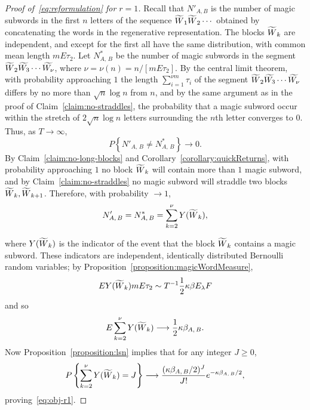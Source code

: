 \documentclass[10pt]{amsart}
\theoremstyle{definition}\newtheorem{defi}[theo]{Definition}\newtheorem{rema}[theo]{Remark}\newtheorem{exam}[theo]{Example}\newtheorem{exem}[theo]{Example}\newtheorem{nota}[theo]{Notation}
\let\oldtilde\tilde
\renewcommand*{\tilde}[1]{\mathchoice{\widetilde{#1}}{\widetilde{#1}}{\oldtilde{#1}}{\oldtilde{#1}}}\let\oldforall\forall
\renewcommand*{\forall}{\mathrel{\oldforall}}
\begin{document}
\begin{proof}[Proof of~\eqref{eq:reformulation} for $r= 1$]
Recall that $N'_{A,B}$ is the number of magic subwords in the first $n$ letters of the sequence $\tilde{W}_{1}\tilde{W}_{2}\dotsb$ obtained by concatenating the words in the regenerative representation. The blocks $\tilde{W}_{k}$ are independent, and except for the first all have the same distribution, with common mean length $mE\tau_{2}$. Let $N^{*}_{A,\,B}$ be the number of magic subwords in the segment $\tilde{W}_{2}\tilde{W_{3}}\dotsb \tilde{W_{\nu}}$, where $\nu =\nu (n)=n/[m E\tau_{2}]$. By the central limit theorem, with probability approaching $1$ the length $\sum_{i=1}^{\nu m}\tau_{i}$ of the segment $\tilde{W}_{2}\tilde{W_{3}}\dotsb \tilde{W_{\nu}}$ differs by no more than $\sqrt{n}\log n$ from $n$, and by the same argument as in the proof of Claim~\ref{claim:no-straddles}, the probability that a magic subword occur within the stretch of $2\sqrt{n}\log n$ letters surrounding the $n$th letter converges to $0$. Thus, as $T \rightarrow\infty$,
\[
P\left\{N'_{A,\,B}\not =N^{*}_{A,\,B} \right\} \longrightarrow 0.
\]
By Claim~\ref{claim:no-long-blocks} and Corollary~\ref{corollary:quickReturns}, with probability approaching $1$ no block $\tilde{W}_{k}$ will contain more than $1$ magic subword, and by Claim~\ref{claim:no-straddles} no magic subword will straddle two blocks $\tilde{W}_{k},\tilde{W}_{k+1}$. Therefore, with probability $\rightarrow 1$,
\[
N'_{A,\,B}=N^{*}_{A,\,B}=\sum_{k=2}^{\nu} Y(\tilde{W}_{k}),
\]

\goodbreak
\noindent where $Y(\tilde{W}_{k})$ is the indicator of the event that the block $\tilde{W}_{k}$ contains a magic subword. These indicators are independent, identically distributed Bernoulli random variables; by Proposition~\ref{proposition:magicWordMeasure},
\[
EY(\tilde{W}_{k}) mE\tau_{2} \sim T^{-1} \frac{1}{2} \kappa \beta E_{\lambda}F
\]
and so
\[
E\sum_{k=2}^{\nu} Y(\tilde{W}_{k}) \longrightarrow \frac{1}{2}
\kappa\beta_{A,\,B}.
\]
Now Proposition~\ref{proposition:lsn} implies that for any integer $J\geq 0$,
\[
P\left\{\sum_{k=2}^{\nu} Y(\tilde{W}_{k})=J \right\}\longrightarrow \frac{(\kappa
\beta_{A,\,B}/2)^{J}}{J!}e^{- \kappa \beta_{A,\,B}/2},
\]
proving~\eqref{eq:obj-r1}.
\end{proof}
\end{document}
